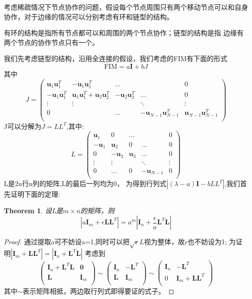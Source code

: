 \documentclass[12pt]{article}
\newtheorem{thm}{Theorem}[section]
\theoremstyle{remark}
\begin{document}
\title{\textbf{}}

\author{}
\maketitle
\large
考虑稀疏情况下节点协作的问题，假设每个节点周围只有两个移动节点可以和自身协作，对于边缘的情况可以分别考虑有环和链型的结构。

有环的结构是指所有节点都可以和周围的两个节点协作；链型的结构是指
边缘有两个节点的协作节点只有一个。

我们先考虑链型的结构，沿用全连接的假设，我们考虑的FIM有下面的形式
\begin{equation}\label{eq:begin}
\text{FIM}=a\bm{I}+bJ
\end{equation}
其中\[
J=\left(
\begin{array}{ccccc}
\bm{u}_1\bm{u}_1^T&-\bm{u}_1\bm{u}_1^T&\dots&&0\\
-\bm{u}_1\bm{u}_1^T&\bm{u}_1\bm{u}_1^T+\bm{u}_2\bm{u}_2^T&-\bm{u}_2\bm{u}_2^T&\dots&0\\
\vdots &\vdots&&\ddots &\vdots\\
0&&\dots&-\bm{u}_{N-1}\bm{u}_{N-1}^T&\bm{u}_{N-1}\bm{u}_{N-1}^T\\
\end{array}
\right)
\]
J可以分解为$J=LL^T$,其中:
\[
L=\left(
\begin{array}{ccccc}
\bm{u}_1&0&\dots&&0\\
-\bm{u}_1&\bm{u}_2&0&\dots&0\\
0&-\bm{u}_2&\bm{u}_3&\dots&0\\
\vdots &\vdots&&\ddots &\vdots\\
0&\dots&0&-\bm{u}_{N-1}&0\\
\end{array}
\right)
\]
L是2n行n列的矩阵,L的最后一列均为0，
为得到行列式$|(\lambda-a)\bm{I}-bLL^T|$,我们首先证明下面的定理:
\begin{thm}
设L是$m\times n$的矩阵，则
\begin{equation}
|a\bm{I}_m+\epsilon \bm{L}\bm{L}^T|=a^m|\bm{I}_n+\frac{\epsilon}{a} \bm{L}^T\bm{L}|
\end{equation}
\end{thm}
\begin{proof}
通过提取a可不妨设a=1,同时可以把$\sqrt{\epsilon}L$视为整体，故$\epsilon$也不妨设为1;
为证明$|\bm{I}_m+\bm{L}\bm{L}^T|=|\bm{I}_n+\bm{L}^T\bm{L}|$
考虑到
\[
\left(\begin{array}{cc}
\bm{I}_n+\bm{L}^T\bm{L}&\bm{0}\\
\bm{L}&\bm{I}_m\\
\end{array}\right)\sim\left(\begin{array}{cc}
\bm{I}_n&-\bm{L}^T\\
\bm{L}&\bm{I}_m\\
\end{array}\right)\sim\left(\begin{array}{cc}
\bm{I}_n&-\bm{L}^T\\
0&\bm{I}_m+\bm{L}\bm{L}^T\\
\end{array}\right)
\]
其中$\sim$表示矩阵相抵，两边取行列式即得要证的式子。
\end{proof}
\end{document}
